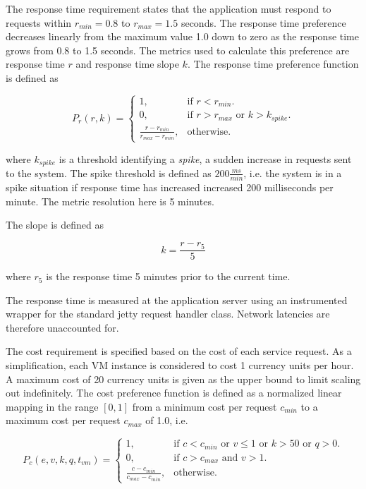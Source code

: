 \documentclass[english]{tktltiki2}
\theoremstyle{definition}
\theoremstyle{remark}
\begin{document}
The response time requirement states that the application must respond to
requests within $r_{min} = 0.8$ to $r_{max} = 1.5$
seconds. The response time preference decreases linearly from the maximum value
1.0 down to zero as the response time grows from 0.8 to 1.5 seconds. The metrics used to calculate this preference are response time $r$ and response
time slope $k$. The response time preference function is defined as  

\begin{equation}
P_{r}(r, k) = \begin{cases}
    1, & \text{if $r < r_{min}$}.\\
    0, & \text{if $r > r_{max}$ or $k > k_{spike}$}.\\
    \frac{r - r_{min}}
    	 {r_{max} - r_{min}}, & \text{otherwise}.
  \end{cases}
  \label{eq:responseTimePreference}
\end{equation}

where $k_{spike}$ is a threshold identifying a \textit{spike}, a sudden increase
in requests sent to the system. The spike threshold is defined as $200
\frac{ms}{min}$, i.e. the system is in a spike situation if response time has
increased increased 200 milliseconds per minute. The metric resolution here is 5
minutes.

The slope is defined as 

\begin{equation}
	k = \frac{r - r_{5}}{5}
  \label{eq:responseTimeSlope}
\end{equation}

where $r_{5}$ is the response time 5 minutes prior to the current time.

The response time is measured at the application server using an instrumented
wrapper for the standard jetty request handler class. Network latencies are
therefore unaccounted for.

The cost requirement is specified based on the cost of each service request. As
a simplification, each VM instance is considered to cost 1 currency units per
hour. A maximum cost of 20 currency units is given as the upper bound to limit
scaling out indefinitely. The cost preference function is defined as a
normalized linear mapping in the range $[0,1]$ from a minimum cost per
request $c_{min}$ to a maximum cost per request
$c_{max}$ of 1.0, i.e. 


\begin{equation}
P_{c}(e, v, k, q, t_{vm}) = \begin{cases}
    1, & \text{if $c < c_{min}$ or $v \leq 1$ or $k > 50$ or $q > 0$}.\\
    0, & \text{if $c > c_{max}$ and $v > 1$}.\\
    \frac{c - c_{min}}
    	 {c_{max} - c_{min}}, & \text{otherwise}.
  \end{cases}
  \label{eq:costPreference}
\end{equation}
\end{document}
